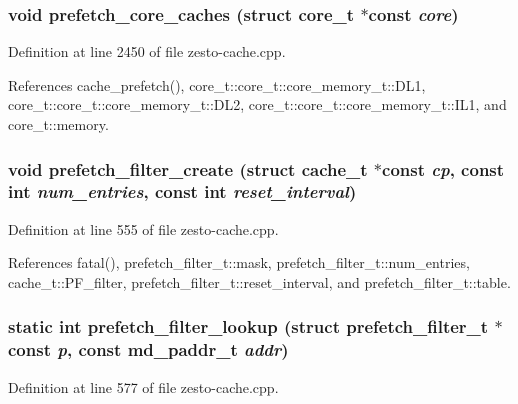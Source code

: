 \subsubsection[{prefetch\_\-core\_\-caches}]{\setlength{\rightskip}{0pt plus 5cm}void prefetch\_\-core\_\-caches (struct {\bf core\_\-t} $\ast$const  {\em core})}\label{zesto-cache_8cpp_3f3ef48df254425f422f6cf5de128ade}




Definition at line 2450 of file zesto-cache.cpp.

References cache\_\-prefetch(), core\_\-t::core\_\-t::core\_\-memory\_\-t::DL1, core\_\-t::core\_\-t::core\_\-memory\_\-t::DL2, core\_\-t::core\_\-t::core\_\-memory\_\-t::IL1, and core\_\-t::memory.
\subsubsection[{prefetch\_\-filter\_\-create}]{\setlength{\rightskip}{0pt plus 5cm}void prefetch\_\-filter\_\-create (struct {\bf cache\_\-t} $\ast$const  {\em cp}, \/  const int {\em num\_\-entries}, \/  const int {\em reset\_\-interval})}\label{zesto-cache_8cpp_81be4d7fbc22a3d9f3fcaa52715c22e9}




Definition at line 555 of file zesto-cache.cpp.

References fatal(), prefetch\_\-filter\_\-t::mask, prefetch\_\-filter\_\-t::num\_\-entries, cache\_\-t::PF\_\-filter, prefetch\_\-filter\_\-t::reset\_\-interval, and prefetch\_\-filter\_\-t::table.
\subsubsection[{prefetch\_\-filter\_\-lookup}]{\setlength{\rightskip}{0pt plus 5cm}static int prefetch\_\-filter\_\-lookup (struct {\bf prefetch\_\-filter\_\-t} $\ast$const  {\em p}, \/  const {\bf md\_\-paddr\_\-t} {\em addr})\hspace{0.3cm}{\tt  [static]}}\label{zesto-cache_8cpp_17dbb4e8d2ae84f22541bef1c04253de}




Definition at line 577 of file zesto-cache.cpp.

